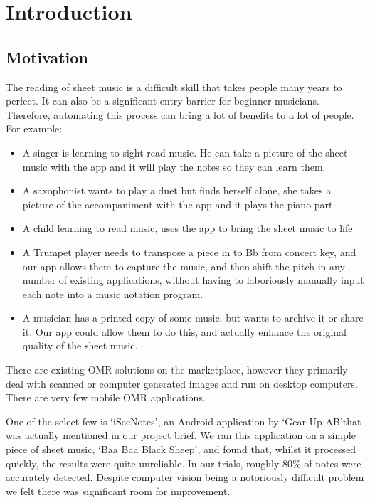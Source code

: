 \section{Introduction}
\subsection{Motivation}
 
The reading of sheet music is a difficult skill that takes people many years to perfect. It can also be a significant entry barrier for beginner musicians. Therefore, automating this process can bring a lot of benefits to a lot of people. For example:

\begin{itemize}
  \item A singer is learning to sight read music. He can take a picture of the sheet music with the app and it will play the notes so they can learn them.
  \item A saxophonist wants to play a duet but finds herself alone, she takes a picture of the accompaniment with the app and it plays the piano part.
  \item A child learning to read music, uses the app to bring the sheet music to life
  \item A Trumpet player needs to transpose a piece in to Bb from concert key, and our app allows them to capture the music, and then shift the pitch in any number of existing applications, without having to laboriously manually input each note into a music notation program.
  \item A musician has a printed copy of some music, but wants to archive it or share it. Our app could allow them to do this, and actually enhance the original quality of the sheet music.
\end{itemize}

There are existing OMR solutions on the marketplace, however they primarily deal with scanned or computer generated images and run on desktop computers. There are very few mobile OMR applications.

One of the select few is \lq iSeeNotes\rq , an Android application by \lq Gear Up AB\rq   that was actually mentioned in our project brief. We ran this application on a simple piece of sheet music, \lq Baa Baa Black Sheep\rq , and found that, whilst it processed quickly, the results were quite unreliable. In our trials, roughly 80\% of notes were accurately detected. Despite computer vision being a notoriously difficult problem we felt there was significant room for improvement.

